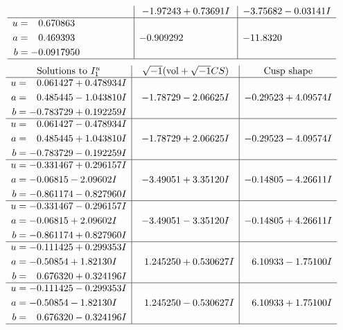 \documentclass[1p]{elsarticle_modified}
\theoremstyle{definition}
\newcommand{\I}{\sqrt{-1}}
\begin{document}
$$\begin{array}{c|c|c}
 & -1.97243 + 0.73691 I & -3.75682 - 0.03141 I \\ \hline\begin{aligned}
u &= \phantom{-}0.670863\phantom{ +0.000000I} \\
a &= \phantom{-}0.469393\phantom{ +0.000000I} \\
b &= -0.0917950\phantom{ +0.000000I}\end{aligned}
 & -0.909292\phantom{ +0.000000I} & -11.8320\phantom{ +0.000000I}\\
 \hline 
 \end{array}$$\newpage$$\begin{array}{c|c|c}  
\text{Solutions to }I^u_{1}& \I (\text{vol} + \sqrt{-1}CS) & \text{Cusp shape}\\
 \hline 
\begin{aligned}
u &= \phantom{-}0.061427 + 0.478934 I \\
a &= \phantom{-}0.485445 - 1.043810 I \\
b &= -0.783729 + 0.192259 I\end{aligned}
 & -1.78729 - 2.06625 I & -0.29523 + 4.09574 I \\ \hline\begin{aligned}
u &= \phantom{-}0.061427 - 0.478934 I \\
a &= \phantom{-}0.485445 + 1.043810 I \\
b &= -0.783729 - 0.192259 I\end{aligned}
 & -1.78729 + 2.06625 I & -0.29523 - 4.09574 I \\ \hline\begin{aligned}
u &= -0.331467 + 0.296157 I \\
a &= -0.06815 - 2.09602 I \\
b &= -0.861174 - 0.827960 I\end{aligned}
 & -3.49051 + 3.35120 I & -0.14805 - 4.26611 I \\ \hline\begin{aligned}
u &= -0.331467 - 0.296157 I \\
a &= -0.06815 + 2.09602 I \\
b &= -0.861174 + 0.827960 I\end{aligned}
 & -3.49051 - 3.35120 I & -0.14805 + 4.26611 I \\ \hline\begin{aligned}
u &= -0.111425 + 0.299353 I \\
a &= -0.50854 + 1.82130 I \\
b &= \phantom{-}0.676320 + 0.324196 I\end{aligned}
 & \phantom{-}1.245250 + 0.530627 I & \phantom{-}6.10933 - 1.75100 I \\ \hline\begin{aligned}
u &= -0.111425 - 0.299353 I \\
a &= -0.50854 - 1.82130 I \\
b &= \phantom{-}0.676320 - 0.324196 I\end{aligned}
 & \phantom{-}1.245250 - 0.530627 I & \phantom{-}6.10933 + 1.75100 I\\
 \hline 
 \end{array}$$\newpage\newpage\renewcommand{\arraystretch}{1}
\end{document}

